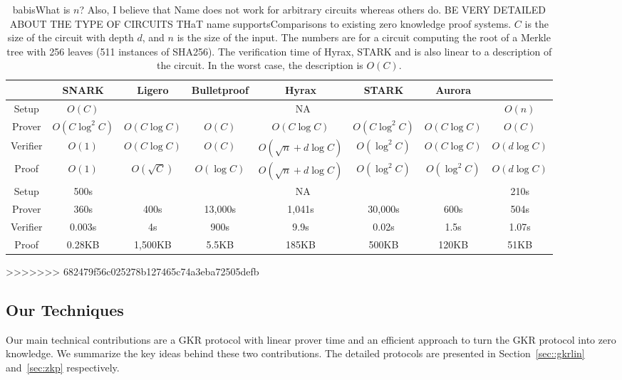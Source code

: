 \begin{table}[h]
	\centering
	{\footnotesize
	\begin{tabular}{|c|c|c|c|c|c|c|c|}
		
		\hline
		&SNARK&Ligero&Bulletproof&Hyrax&STARK&Aurora&\name\\
		\hline
		\hline
		Setup&$O(C)$&\multicolumn{5}{c|}{NA}&$O(n)$\\
		\hline
		Prover&$O(C\log^2C)$&$O(C\log C)$&$O(C)$&$O(C\log C)$&$O(C\log^2 C)$&$O(C\log C)$ &$O(C)$\\
		\hline
		Verifier&$O(1)$&$O(C\log C)$&$O(C)$&$O(\sqrt{n}+d\log C)$&$O(\log^2 C)$&$O(C\log C)$&$O(d\log C)$\\
		\hline
		Proof&$O(1)$&$O(\sqrt{C})$&$O(\log C)$&$O(\sqrt{n}+d\log C)$&$O(\log^2 C)$& $O(\log^2 C)$&$O(d\log C)$\\
		\hline
		\hline
		Setup&500s&\multicolumn{5}{c|}{NA}&210s\\
		\hline
		Prover&360s&400s&13,000s&1,041s&30,000s&600s&504s\\
		\hline
		Verifier&0.003s&4s&900s&9.9s&0.02s&1.5s&1.07s\\
		\hline
		Proof&0.28KB&1,500KB&5.5KB&185KB&500KB&120KB&51KB\\
		\hline
	\end{tabular}
}

\caption{babis{What is $n$? Also, I believe that Name does not work for arbitrary circuits whereas others do. BE VERY DETAILED ABOUT THE TYPE OF CIRCUITS THaT name supports}Comparisons to existing zero knowledge proof systems. $C$ is the size of the circuit with depth $d$, and $n$ is the size of the input. The numbers are for a circuit computing the root of a Merkle tree with 256 leaves (511 instances of SHA256). The verification time of Hyrax, STARK and \name is also linear to a description of the circuit. In the worst case, the description is $O(C)$.\protect\footnotemark}\label{tab:zkpall}
>>>>>>> 682479f56c025278b127465c74a3eba72505defb
\end{table}

\subsection{Our Techniques}
Our main technical contributions are a GKR protocol with linear prover time and an efficient approach to turn the GKR protocol into zero knowledge. We summarize the key ideas behind these two contributions. The detailed protocols are presented in Section~\ref{sec::gkrlin} and~\ref{sec:zkp} respectively.

